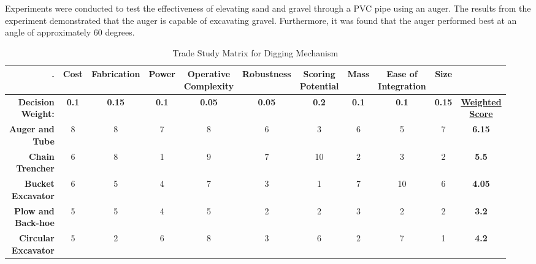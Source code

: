 \documentclass[class=article, crop=false]{standalone}
\begin{document}
Experiments were conducted to test the effectiveness of elevating sand and gravel through a PVC pipe using an auger. The results from the experiment demonstrated that the auger is capable of excavating gravel. Furthermore, it was found that the auger performed best at an angle of approximately 60 degrees. 



\FloatBarrier
	\begin{table}[h]
	\scriptsize
	\centering
	\begin{tabular}{ | r | c | c | c | c | c | c | c | c | c | c |}
 	\hline
 		\rowcolor[gray]{0.8}
 		\textbf{.} &\textbf{Cost} &\textbf{Fabrication} &\textbf{Power} &\makecell{\textbf{Operative} \\ \textbf{Complexity}} &\textbf{Robustness} &\makecell{\textbf{Scoring} \\ \textbf{Potential}} &\textbf{Mass} & \makecell{\textbf{Ease of} \\ \textbf{Integration}} &\textbf{Size} &  \\ 
 		\hline
		\makecell{\textbf{Decision} \\ \textbf{Weight:}}& \textbf{0.1} &\textbf{0.15} &\textbf{0.1} &\textbf{0.05} &\textbf{0.05} &\textbf{0.2} &
		\textbf{0.1} &\textbf{0.1}  &\textbf{0.15} &\makecell{\textbf{\underline{Weighted}} \\ \textbf{\underline{Score}}}  \\ 
 		\hline\hline
 		\makecell{\textbf{Auger and} \\ \textbf{Tube}}    & 8 & 8 & 7 & 8 & 6 & 3 & 6 & 5 & 7 & \textbf{6.15} \\ 
 		\hline
 		\makecell{\textbf{Chain} \\ \textbf{Trencher}}    & 6 & 8 & 1 & 9 & 7 & 10 & 2 & 3 & 2 & \textbf{5.5} \\
 		\hline
 		\makecell{\textbf{Bucket} \\ \textbf{Excavator}}  & 6 & 5 & 4 & 7 & 3 & 1 & 7 & 10 & 6 & \textbf{4.05} \\
 		\hline
 		\makecell{\textbf{Plow and} \\ \textbf{Back-hoe}} & 5 & 5 & 4 & 5 & 2 & 2 & 3 & 2 & 2 & \textbf{3.2} \\
 		\hline
 		\makecell{\textbf{Circular} \\ \textbf{Excavator}}& 5 & 2 & 6 & 8 & 3 & 6 & 2 & 7 & 1 & \textbf{4.2} \\ 
 		\hline
	\end{tabular}
	\caption{Trade Study Matrix for Digging Mechanism}
		\label{table:dig-trade-study}
	\end{table}
	\FloatBarrier
	
\end{document}
